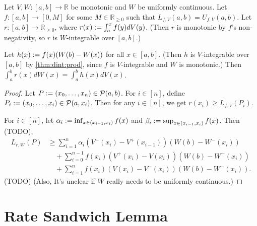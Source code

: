 \documentclass[a4paper,12pt,fleqn]{article}
\begin{document}
\begin{lemma}
Let $V, W: [a, b] \to \mathbb{R}$ be monotonic and $W$ be uniformly continuous.
Let $f: [a, b] \to [0, M]$ for some $M \in \mathbb{R}_{\ge 0}$
such that $L_{f,V}(a, b) = U_{f,V}(a, b)$.
Let $r: [a, b] \to \mathbb{R}_{\ge 0}$, where
$r(x) := \int_a^x f(y)dV(y)$.
(Then $r$ is monotonic by $f$'s non-negativity,
so $r$ is $W$-integrable over $[a, b]$.)

Let $h(x) := f(x)(W(b)-W(x))$ for all $x \in [a, b]$.
(Then $h$ is $V$-integrable over $[a, b]$ by \cref{thm:dint:prod},
since $f$ is $V$-integrable and $W$ is monotonic.)
Then $\int_a^b r(x)dW(x) = \int_a^b h(x)dV(x)$.
\end{lemma}
\begin{proof}
Let $P := (x_0, \ldots, x_n) \in \mathcal{P}(a, b)$.
For $i \in [n]$, define $P_i := (x_0, \ldots, x_i) \in \mathcal{P}(a, x_i)$.
Then for any $i \in [n]$, we get $r(x_i) \ge L_{f,V}(P_i)$.

For $i \in [n]$, let $\alpha_i := \inf_{x \in (x_{i-1}, x_i)} f(x)$
and $\beta_i := \sup_{x \in (x_{i-1}, x_i)} f(x)$.
%
Then (TODO),
\begin{align*}
L_{r,W}(P) &\ge \sum_{i=1}^n \alpha_i(V^-(x_i)-V^+(x_{i-1}))(W(b)-W^-(x_i))
    \\ &\quad + \sum_{i=0}^{n-1} f(x_i)(V^+(x_i)-V(x_i))(W(b)-W^+(x_i))
    \\ &\quad + \sum_{i=1}^n f(x_i)(V(x_i)-V^-(x_i))(W(b)-W^-(x_i)).
\end{align*}
(TODO)
(Also, It's unclear if $W$ really needs to be uniformly continuous.)
\end{proof}

\section{Rate Sandwich Lemma}
\end{document}
